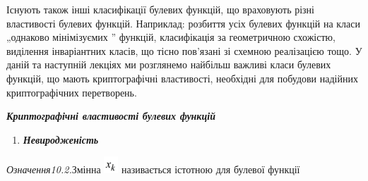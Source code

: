 Існують також інші класифікації булевих функцій, що враховують різні властивості
булевих функцій. Наприклад: розбиття усіх булевих функцій на класи „однаково
мінімізуємих ” функцій, класифікація за геометричною схожістю, виділення
інваріантних класів, що тісно пов’язані зі схемною реалізацією тощо. У даній та
наступній лекціях ми розглянемо найбільш важливі класи булевих функцій, що
мають криптографічні властивості, необхідні для побудови надійних
криптографічних перетворень.


\bigskip

{\centering\bfseries\itshape
Криптографічні властивості булевих функцій
\par}


\bigskip


\bigskip

\liststyleWWviiiNumxxix
\begin{enumerate}
\item {\bfseries\itshape
Невиродженість}
\end{enumerate}
 \textit{Означення10.2.}Змінна  
\includegraphics[width=0.2083in,height=0.25in]{crypt-img/crypt-img193.png} 
називається  істотною для булевої функції 
